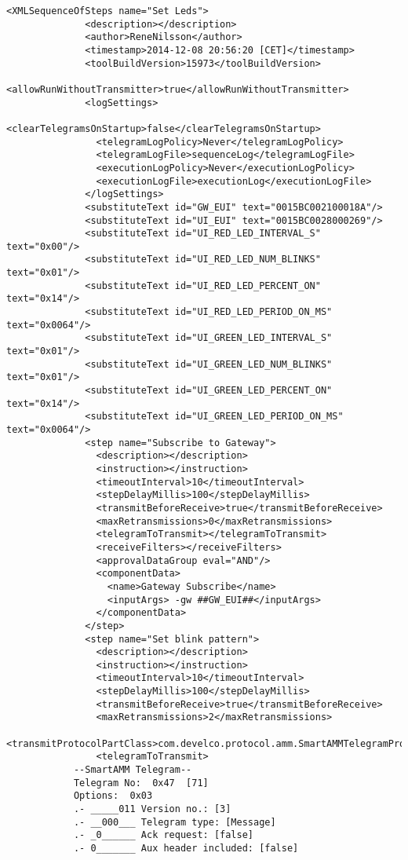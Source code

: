\documentclass[Main]{subfiles}
\begin{document}
		\begin{lstlisting}[caption=Set LED Green, style=Code-XML]
			<XMLSequenceOfSteps name="Set Leds">
			  <description></description>
			  <author>ReneNilsson</author>
			  <timestamp>2014-12-08 20:56:20 [CET]</timestamp>
			  <toolBuildVersion>15973</toolBuildVersion>
			  <allowRunWithoutTransmitter>true</allowRunWithoutTransmitter>
			  <logSettings>
			    <clearTelegramsOnStartup>false</clearTelegramsOnStartup>
			    <telegramLogPolicy>Never</telegramLogPolicy>
			    <telegramLogFile>sequenceLog</telegramLogFile>
			    <executionLogPolicy>Never</executionLogPolicy>
			    <executionLogFile>executionLog</executionLogFile>
			  </logSettings>
			  <substituteText id="GW_EUI" text="0015BC002100018A"/>
			  <substituteText id="UI_EUI" text="0015BC0028000269"/>
			  <substituteText id="UI_RED_LED_INTERVAL_S"      text="0x00"/>
			  <substituteText id="UI_RED_LED_NUM_BLINKS"      text="0x01"/>
			  <substituteText id="UI_RED_LED_PERCENT_ON"      text="0x14"/>
			  <substituteText id="UI_RED_LED_PERIOD_ON_MS"    text="0x0064"/>
			  <substituteText id="UI_GREEN_LED_INTERVAL_S"    text="0x01"/>
			  <substituteText id="UI_GREEN_LED_NUM_BLINKS"    text="0x01"/>
			  <substituteText id="UI_GREEN_LED_PERCENT_ON"    text="0x14"/>
			  <substituteText id="UI_GREEN_LED_PERIOD_ON_MS"  text="0x0064"/>
			  <step name="Subscribe to Gateway">
			    <description></description>
			    <instruction></instruction>
			    <timeoutInterval>10</timeoutInterval>
			    <stepDelayMillis>100</stepDelayMillis>
			    <transmitBeforeReceive>true</transmitBeforeReceive>
			    <maxRetransmissions>0</maxRetransmissions>
			    <telegramToTransmit></telegramToTransmit>
			    <receiveFilters></receiveFilters>
			    <approvalDataGroup eval="AND"/>
			    <componentData>
			      <name>Gateway Subscribe</name>
			      <inputArgs> -gw ##GW_EUI##</inputArgs>
			    </componentData>
			  </step>
			  <step name="Set blink pattern">
			    <description></description>
			    <instruction></instruction>
			    <timeoutInterval>10</timeoutInterval>
			    <stepDelayMillis>100</stepDelayMillis>
			    <transmitBeforeReceive>true</transmitBeforeReceive>
			    <maxRetransmissions>2</maxRetransmissions>
			    <transmitProtocolPartClass>com.develco.protocol.amm.SmartAMMTelegramProtocol</transmitProtocolPartClass>
			    <telegramToTransmit>
			--SmartAMM Telegram--
			Telegram No:  0x47  [71]
			Options:  0x03  
			.- _____011 Version no.: [3]
			.- __000___ Telegram type: [Message]
			.- _0______ Ack request: [false]
			.- 0_______ Aux header included: [false]

\end{lstlisting}
\end{document}
